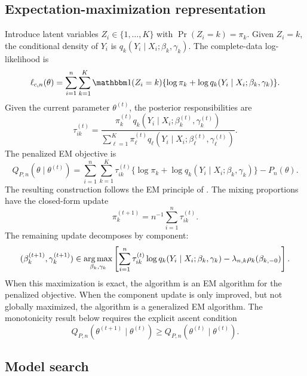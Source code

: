 \subsection{Expectation-maximization representation}

Introduce latent variables \(Z_i\in\{1,\ldots,K\}\) with
\(\Pr(Z_i=k)=\pi_k\).  Given \(Z_i=k\), the conditional density of \(Y_i\) is
\(q_k(Y_i\mid X_i;\beta_k,\gamma_k)\).  The complete-data log-likelihood is
\[
    \ell_{c,n}(\theta)
    =
    \sum_{i=1}^n\sum_{k=1}^K
    \mathbbm 1(Z_i=k)
    \{\log\pi_k+\log q_k(Y_i\mid X_i;\beta_k,\gamma_k)\}.
\]
Given the current parameter \(\theta^{(t)}\), the posterior responsibilities are
\[
    \tau_{ik}^{(t)}
    =
    \frac{
        \pi_k^{(t)}q_k(Y_i\mid X_i;\beta_k^{(t)},\gamma_k^{(t)})
    }{
        \sum_{\ell=1}^K
        \pi_\ell^{(t)}
        q_\ell(Y_i\mid X_i;\beta_\ell^{(t)},\gamma_\ell^{(t)})
    }.
\]
The penalized EM objective is
\[
    Q_{P,n}(\theta\mid\theta^{(t)})
    =
    \sum_{i=1}^n\sum_{k=1}^K
    \tau_{ik}^{(t)}
    \{\log\pi_k+\log q_k(Y_i\mid X_i;\beta_k,\gamma_k)\}
    -
    P_n(\theta).
\]
The resulting construction follows the EM principle of
\citet{dempster1977em}.  The mixing proportions have the closed-form update
\[
    \pi_k^{(t+1)}
    =
    n^{-1}\sum_{i=1}^n\tau_{ik}^{(t)}.
\]
The remaining update decomposes by component:
\[
    (\beta_k^{(t+1)},\gamma_k^{(t+1)})
    \in
    \operatorname*{arg\,max}_{\beta_k,\gamma_k}
    \left[
    \sum_{i=1}^n\tau_{ik}^{(t)}
    \log q_k(Y_i\mid X_i;\beta_k,\gamma_k)
    -
    \lambda_{n,k}\rho_k(\beta_{k,-0})
    \right].
\]
When this maximization is exact, the algorithm is an EM algorithm for the
penalized objective.  When the component update is only improved, but not
globally maximized, the algorithm is a generalized EM algorithm.  The
monotonicity result below requires the explicit ascent condition
\[
    Q_{P,n}(\theta^{(t+1)}\mid\theta^{(t)})
    \ge
    Q_{P,n}(\theta^{(t)}\mid\theta^{(t)}).
\]

\subsection{Model search}

